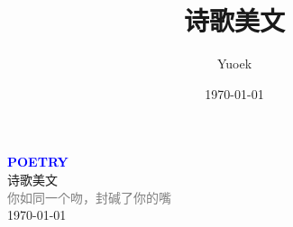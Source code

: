\documentclass[UTF8, a4paper, 12pt]{ctexart}
\title{\Large 诗歌美文}
\author{Yuoek}
\date{\today}
\begin{document}
\thispagestyle{empty}
\maketitle
\clearpage

\tableofcontents
\clearpage

\thispagestyle{empty}
\vspace*{\fill}
\begin{center}
    \textcolor{blue}{\Huge\textbf{POETRY}} \\[1em]
    \textcolor{blue!60!black}{\Large 诗歌美文} \\[2em]
    \textcolor{gray}{\large 你如同一个吻，封碱了你的嘴} \\[1em]
    \today
\end{center}
\vspace*{\fill}
\clearpage


\clearpage

\clearpage
\end{document}
